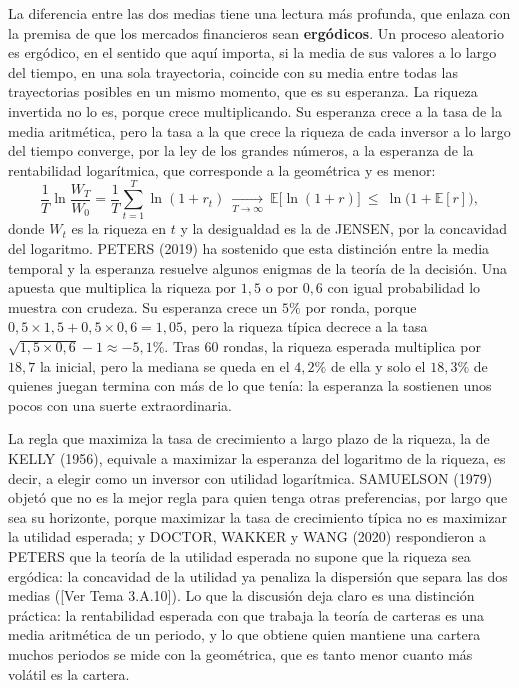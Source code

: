 \documentclass[10pt,a4paper]{article}
\newcommand{\authorfont}[1]{{\fontfamily{EBGaramond-TLF}\selectfont #1}}
\begin{document}
La diferencia entre las dos medias tiene una lectura más profunda, que enlaza con la premisa de que los mercados financieros sean \textbf{ergódicos}. Un proceso aleatorio es ergódico, en el sentido que aquí importa, si la media de sus valores a lo largo del tiempo, en una sola trayectoria, coincide con su media entre todas las trayectorias posibles en un mismo momento, que es su esperanza. La riqueza invertida no lo es, porque crece multiplicando. Su esperanza crece a la tasa de la media aritmética, pero la tasa a la que crece la riqueza de cada inversor a lo largo del tiempo converge, por la ley de los grandes números, a la esperanza de la rentabilidad logarítmica, que corresponde a la geométrica y es menor:
$$\frac{1}{T}\ln\frac{W_T}{W_0}=\frac{1}{T}\sum_{t=1}^{T}\ln(1+r_t)\ \xrightarrow[T\to\infty]{}\ \mathbb E\big[\ln(1+r)\big]\ \leq\ \ln\big(1+\mathbb E[r]\big),$$
donde $W_t$ es la riqueza en $t$ y la desigualdad es la de JENSEN, por la concavidad del logaritmo. PETERS (2019) ha sostenido que esta distinción entre la media temporal y la esperanza resuelve algunos enigmas de la teoría de la decisión. Una apuesta que multiplica la riqueza por $1{,}5$ o por $0{,}6$ con igual probabilidad lo muestra con crudeza. Su esperanza crece un $5\%$ por ronda, porque $0{,}5\times1{,}5+0{,}5\times0{,}6=1{,}05$, pero la riqueza típica decrece a la tasa $\sqrt{1{,}5\times0{,}6}-1\approx-5{,}1\%$. Tras $60$ rondas, la riqueza esperada multiplica por $18{,}7$ la inicial, pero la mediana se queda en el $4{,}2\%$ de ella y solo el $18{,}3\%$ de quienes juegan termina con más de lo que tenía: la esperanza la sostienen unos pocos con una suerte extraordinaria.

La regla que maximiza la tasa de crecimiento a largo plazo de la riqueza, la de KELLY (1956), equivale a maximizar la esperanza del logaritmo de la riqueza, es decir, a elegir como un inversor con utilidad logarítmica. SAMUELSON (1979) objetó que no es la mejor regla para quien tenga otras preferencias, por largo que sea su horizonte, porque maximizar la tasa de crecimiento típica no es maximizar la utilidad esperada; y DOCTOR, WAKKER y WANG (2020) respondieron a PETERS que la teoría de la utilidad esperada no supone que la riqueza sea ergódica: la concavidad de la utilidad ya penaliza la dispersión que separa las dos medias ([\authorfont{Ver Tema 3.A.10}]). Lo que la discusión deja claro es una distinción práctica: la rentabilidad esperada con que trabaja la teoría de carteras es una media aritmética de un periodo, y lo que obtiene quien mantiene una cartera muchos periodos se mide con la geométrica, que es tanto menor cuanto más volátil es la cartera.
\end{document}
